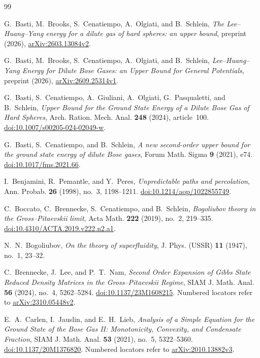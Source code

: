 \begin{thebibliography}{99}

G.~Basti, M.~Brooks, S.~Cenatiempo, A.~Olgiati, and B.~Schlein,
\emph{The Lee--Huang--Yang energy for a dilute gas of hard spheres:
an upper bound}, preprint (2026),
\href{https://arxiv.org/abs/2603.13084v2}{arXiv:2603.13084v2}.

G.~Basti, M.~Brooks, S.~Cenatiempo, A.~Olgiati, and B.~Schlein,
\emph{Lee--Huang--Yang Energy for Dilute Bose Gases:
an Upper Bound for General Potentials}, preprint (2026),
\href{https://arxiv.org/abs/2609.25314v1}{arXiv:2609.25314v1}.

G.~Basti, S.~Cenatiempo, A.~Giuliani, A.~Olgiati, G.~Pasqualetti,
and B.~Schlein,
\emph{Upper Bound for the Ground State Energy of a Dilute Bose Gas
of Hard Spheres}, Arch. Ration. Mech. Anal. \textbf{248} (2024),
article~100.
\href{https://doi.org/10.1007/s00205-024-02049-w}{doi:10.1007/s00205-024-02049-w}.

G.~Basti, S.~Cenatiempo, and B.~Schlein,
\emph{A new second-order upper bound for the ground state energy
of dilute Bose gases}, Forum Math. Sigma \textbf{9} (2021), e74.
\href{https://doi.org/10.1017/fms.2021.66}{doi:10.1017/fms.2021.66}.

I.~Benjamini, R.~Pemantle, and Y.~Peres,
\emph{Unpredictable paths and percolation},
Ann. Probab. \textbf{26} (1998), no.~3, 1198--1211.
\href{https://doi.org/10.1214/aop/1022855749}{doi:10.1214/aop/1022855749}.

C.~Boccato, C.~Brennecke, S.~Cenatiempo, and B.~Schlein,
\emph{Bogoliubov theory in the Gross--Pitaevskii limit},
Acta Math. \textbf{222} (2019), no.~2, 219--335.
\href{https://doi.org/10.4310/ACTA.2019.v222.n2.a1}{doi:10.4310/ACTA.2019.v222.n2.a1}.

N.~N.~Bogoliubov,
\emph{On the theory of superfluidity},
J. Phys. (USSR) \textbf{11} (1947), no.~1, 23--32.

C.~Brennecke, J.~Lee, and P.~T.~Nam,
\emph{Second Order Expansion of Gibbs State Reduced Density Matrices
in the Gross--Pitaevskii Regime}, SIAM J. Math. Anal. \textbf{56}
(2024), no.~4, 5262--5284.
\href{https://doi.org/10.1137/23M1608215}{doi:10.1137/23M1608215}.
Numbered locators refer to
\href{https://arxiv.org/abs/2310.05448v2}{arXiv:2310.05448v2}.

E.~A.~Carlen, I.~Jauslin, and E.~H.~Lieb,
\emph{Analysis of a Simple Equation for the Ground State of the Bose Gas II:
Monotonicity, Convexity, and Condensate Fraction},
SIAM J. Math. Anal. \textbf{53} (2021), no.~5, 5322--5360.
\href{https://doi.org/10.1137/20M1376820}{doi:10.1137/20M1376820}.
Numbered locators refer to
\href{https://arxiv.org/abs/2010.13882v3}{arXiv:2010.13882v3}.


\end{thebibliography}
